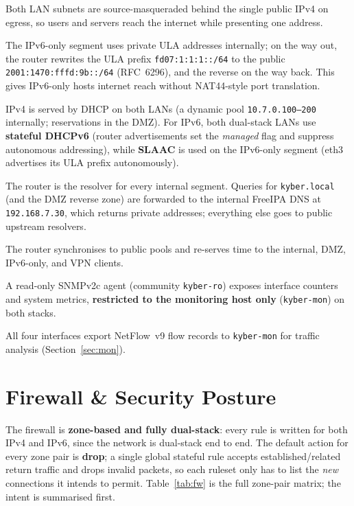 \documentclass[11pt,a4paper]{article}
\newcommand{\code}[1]{\texttt{#1}}
\begin{document}
\begin{description}[leftmargin=1.4em,style=nextline]
  \item[NAT44 (outbound internet)] Both LAN subnets are source-masqueraded behind the
    single public IPv4 on egress, so users and servers reach the internet while presenting
    one address.
  \item[NPTv6 (IPv6 prefix translation)] The IPv6-only segment uses private ULA addresses
    internally; on the way out, the router rewrites the ULA prefix
    \code{fd07:1:1:1::/64} to the public \code{2001:1470:fffd:9b::/64} (RFC~6296), and the
    reverse on the way back. This gives IPv6-only hosts internet reach without NAT44-style
    port translation.
  \item[DHCP / DHCPv6 / SLAAC] IPv4 is served by DHCP on both LANs (a dynamic pool
    \code{10.7.0.100--200} internally; reservations in the DMZ). For IPv6, both dual-stack
    LANs use \textbf{stateful DHCPv6} (router advertisements set the \emph{managed} flag and
    suppress autonomous addressing), while \textbf{SLAAC} is used on the IPv6-only segment
    (eth3 advertises its ULA prefix autonomously).
  \item[DNS forwarding \& split DNS] The router is the resolver for every internal segment.
    Queries for \code{kyber.local} (and the DMZ reverse zone) are forwarded to the internal
    FreeIPA DNS at \code{192.168.7.30}, which returns private addresses; everything else
    goes to public upstream resolvers.
  \item[NTP relay] The router synchronises to public pools and re-serves time to the
    internal, DMZ, IPv6-only, and VPN clients.
  \item[SNMP agent] A read-only SNMPv2c agent (community \code{kyber-ro}) exposes interface
    counters and system metrics, \textbf{restricted to the monitoring host only}
    (\code{kyber-mon}) on both stacks.
  \item[NetFlow export] All four interfaces export NetFlow~v9 flow records to
    \code{kyber-mon} for traffic analysis (Section~\ref{sec:mon}).
\end{description}

\section{Firewall \& Security Posture}
\label{sec:fw}

The firewall is \textbf{zone-based and fully dual-stack}: every rule is written for both
IPv4 and IPv6, since the network is dual-stack end to end. The default action for every
zone pair is \textbf{drop}; a single global stateful rule accepts established/related return
traffic and drops invalid packets, so each ruleset only has to list the \emph{new}
connections it intends to permit. Table~\ref{tab:fw} is the full zone-pair matrix; the
intent is summarised first.
\end{document}
